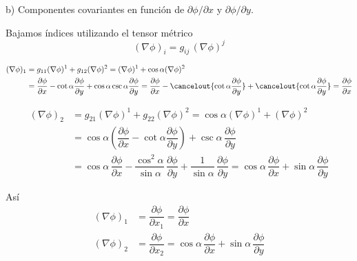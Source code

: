 \noindent
b) Componentes covariantes en función de $\partial\phi/\partial x$ y
$\partial\phi/\partial y$.

Bajamos índices utilizando el tensor métrico
\[
  (\nabla\phi)_i = g_{ij}\,(\nabla\phi)^j
\]

\begin{align*}
  (\nabla\phi)_1
  &=
    g_{11}(\nabla\phi)^1 + g_{12}(\nabla\phi)^2
    = (\nabla\phi)^1 + \cos\alpha (\nabla\phi)^2\\
  &=
    \dfrac{\partial\phi}{\partial x}-\cot\alpha\dfrac{\partial\phi}{\partial y}
    + \cos\alpha\csc\alpha\dfrac{\partial\phi}{\partial y}
    = \dfrac{\partial\phi}{\partial x}
    - \cancelout{\cot\alpha\dfrac{\partial\phi}{\partial y}}
    + \cancelout{\cot\alpha\dfrac{\partial\phi}{\partial y}}
    =
    \dfrac{\partial\phi}{\partial x}
\end{align*}

\begin{align*}
  (\nabla\phi)_2
  &=
    g_{21}(\nabla\phi)^1 + g_{22}(\nabla\phi)^2
    = \cos\alpha (\nabla\phi)^1 + (\nabla\phi)^2\\
  &=
    \cos\alpha
    \left(%
    \dfrac{\partial\phi}{\partial x}-\cot\alpha\dfrac{\partial\phi}{\partial y}
    \right)
    + \csc\alpha\,\dfrac{\partial\phi}{\partial y}\\
  &= \cos\alpha\,\dfrac{\partial\phi}{\partial x}
    - \dfrac{\cos^2\alpha}{\sin\alpha}\,\dfrac{\partial\phi}{\partial y}
    + \dfrac{1}{\sin\alpha}\,\dfrac{\partial\phi}{\partial y}
    = \cos\alpha\,\dfrac{\partial\phi}{\partial x}
    + \sin\alpha\,\dfrac{\partial\phi}{\partial y}
\end{align*}

Así
\begin{align*}
  (\nabla\phi)_1
  &=
    \dfrac{\partial\phi}{\partial x_1}
    = \dfrac{\partial\phi}{\partial x}\\
  (\nabla\phi)_2
  &=
    \dfrac{\partial\phi}{\partial x_2}
    = \cos\alpha\,\dfrac{\partial\phi}{\partial x}
    + \sin\alpha\,\dfrac{\partial\phi}{\partial y}
\end{align*}


